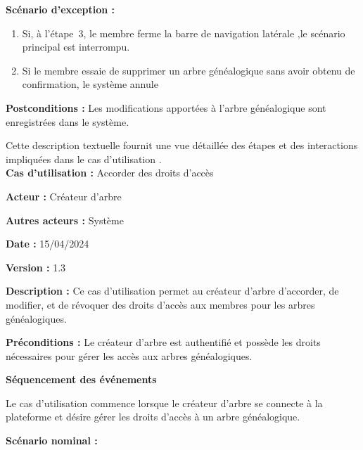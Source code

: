 \textbf{Scénario d'exception :}
\begin{enumerate}
  \item Si, à l’étape 3, le membre ferme la barre de navigation latérale
    ,le scénario principal est interrompu.

  \item Si le membre essaie de supprimer un arbre généalogique sans avoir
    obtenu de confirmation, le système annule
\end{enumerate}

\textbf{Postconditions :} Les modifications apportées à l'arbre généalogique
sont enregistrées dans le système.

Cette description textuelle fournit une vue détaillée des étapes et des
interactions impliquées dans le cas d’utilisation .
\\

\textbf{Cas d’utilisation :} Accorder des droits d’accès

\textbf{Acteur :} Créateur d'arbre

\textbf{Autres acteurs :} Système

\textbf{Date :} 15/04/2024

\textbf{Version :} 1.3


\textbf{Description :} Ce cas d’utilisation permet au créateur d'arbre d'accorder,
de modifier, et de révoquer des droits d'accès aux  membres pour
les arbres généalogiques.

\textbf{Préconditions :} Le créateur d'arbre est authentifié et possède les droits
nécessaires pour gérer les accès aux arbres généalogiques.


\textbf{Séquencement des événements}

Le cas d’utilisation commence lorsque le créateur d'arbre se connecte à la
plateforme et désire gérer les droits d'accès à un arbre généalogique.

\textbf{Scénario nominal :}

